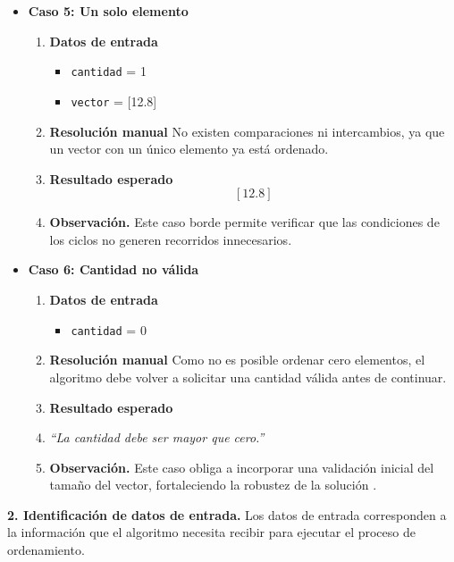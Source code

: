 \documentclass[12pt,twoside]{book}
\begin{document}
\begin{itemize}
							\item \textbf{Caso 5: Un solo elemento}
							\begin{enumerate}
								\item \textbf{Datos de entrada}
								\begin{itemize}
									\item \texttt{cantidad} = 1
									\item \texttt{vector} = [12.8]
								\end{itemize}
								\item \textbf{Resolución manual}
								No existen comparaciones ni intercambios, ya que un vector con un único elemento ya está ordenado.
								\item \textbf{Resultado esperado}
								\[
								[12.8]
								\]
								\item \textbf{Observación.} Este caso borde permite verificar que las condiciones de los ciclos no generen recorridos innecesarios.
							\end{enumerate}
							
							
							\item \textbf{Caso 6: Cantidad no válida}
							\begin{enumerate}
								\item \textbf{Datos de entrada}
								\begin{itemize}
									\item \texttt{cantidad} = 0
								\end{itemize}
								\item \textbf{Resolución manual}
								Como no es posible ordenar cero elementos, el algoritmo debe volver a solicitar una cantidad válida antes de continuar.
								\item \textbf{Resultado esperado}
								\item \textit{``La cantidad debe ser mayor que cero.''}
								\item \textbf{Observación.} Este caso obliga a incorporar una validación inicial del tamaño del vector, fortaleciendo la robustez de la solución \cite{Pressman2019Software,Sommerville2015Software}.
							\end{enumerate}
						\end{itemize}
						
						\noindent
						\textbf{2. Identificación de datos de entrada.}
						Los datos de entrada corresponden a la información que el algoritmo necesita recibir para ejecutar el proceso de ordenamiento.
						
\end{document}
